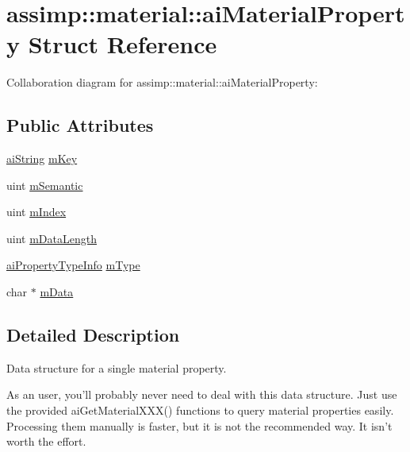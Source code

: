 \hypertarget{structassimp_1_1material_1_1ai_material_property}{\section{assimp\+:\+:material\+:\+:ai\+Material\+Property Struct Reference}
\label{structassimp_1_1material_1_1ai_material_property}
}


Collaboration diagram for assimp\+:\+:material\+:\+:ai\+Material\+Property\+:
\subsection*{Public Attributes}
\begin{DoxyCompactItemize}
\item 
\hyperlink{structassimp_1_1types_1_1ai_string}{ai\+String} \hyperlink{structassimp_1_1material_1_1ai_material_property_afe4ebd7e7adaccee8f4a5322aeb59757}{m\+Key}
\item 
uint \hyperlink{structassimp_1_1material_1_1ai_material_property_a12b6a483209cee22013648d1a4388259}{m\+Semantic}
\item 
uint \hyperlink{structassimp_1_1material_1_1ai_material_property_ae24935f31f41f397e9558a2f9022b066}{m\+Index}
\item 
uint \hyperlink{structassimp_1_1material_1_1ai_material_property_a05a3fdd6e28bc2246d56162cf5f68bc2}{m\+Data\+Length}
\item 
\hyperlink{namespaceassimp_1_1material_a9c77cffdda8a7bb8e6f97ff5e490702a}{ai\+Property\+Type\+Info} \hyperlink{structassimp_1_1material_1_1ai_material_property_a50ea7cf49a1560abff974c8838acadb4}{m\+Type}
\item 
char $\ast$ \hyperlink{structassimp_1_1material_1_1ai_material_property_adf2f2f2289591165b4a56435f9ca8c02}{m\+Data}
\end{DoxyCompactItemize}


\subsection{Detailed Description}
Data structure for a single material property.

As an user, you'll probably never need to deal with this data structure. Just use the provided {\ttfamily ai\+Get\+Material\+X\+X\+X()} functions to query material properties easily. Processing them manually is faster, but it is not the recommended way. It isn't worth the effort.

